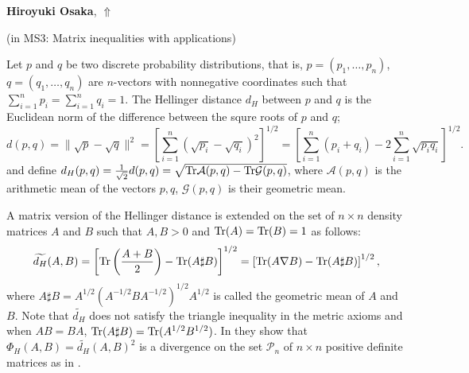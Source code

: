 \documentclass[ILAS2025-program.tex]{subfiles}
\begin{document}
\hypertarget{down0266}{}\begin{ilasabstract}
    
\textbf{Hiroyuki Osaka},  \hfill \hyperlink{up0266}{$\Uparrow$}
    
    
(in {\color{mstitle}MS3: Matrix inequalities with applications})
        
\mtskip
    \begin{bibunit}
        Let $p$ and $q$ be two discrete probability distributions, that is, $p=(p_1, \dots, p_n)$, $q = (q_1, \dots, q_n)$ are $n$-vectors with nonnegative coordinates such that $\sum_{i=1}^np_i = \sum_{i=1}^nq_i = 1$. The Hellinger distance $d_H$ between $p$ and $q$ is the Euclidean norm of the difference between the squre roots of $p$ and $q$; 
$$
d(p,q) = \|\sqrt{p}-\sqrt{q}\|^2 = \left[\sum_{i=1}^n(\sqrt{p_i}-\sqrt{q_i})^2\right]^{1/2}
 = \left[\sum_{i=1}^n(p_i+q_i) -2\sum_{i=1}^n\sqrt{p_iq_i}\right]^{1/2}.
$$
and define $d_H(p, q) = \frac{1}{\sqrt{2}}d(p,q) = \sqrt{{\rm Tr} \mathcal{A}(p,q) - {\rm Tr}\mathcal{G}(p,q)}$, where 
$\mathcal{A}(p,q)$ is the arithmetic mean of the vectors $p,q$, $\mathcal{G}(p,q)$ is their geometric mean.  

A matrix version of the Hellinger distance is extended on the set %
of $n \times n$   density matrices $A$ and $B$ such that $A, B > 0$ and ${\rm Tr}(A) = {\rm Tr}(B) = 1$ as follows:
$$
\widetilde{d_H}(A, B) = \left[{\rm Tr}\left(\frac{A + B}{2}\right) - {\rm Tr}(A\sharp B)\right]^{1/2} 
= \left[{\rm Tr}(A\nabla B) - {\rm Tr}(A\sharp B)\right]^{1/2} ,
$$
where $A \sharp B = A^{1/2}(A^{-1/2}BA^{-1/2})^{1/2}A^{1/2}$ is called the geometric mean of $A$ and $B$.
Note that $\widetilde{d_H}$ does not satisfy the triangle inequality in the metric axioms and when $AB = BA$, ${\rm Tr}(A \sharp B) = {\rm Tr}(A^{1/2}B^{1/2})$.  In \cite{BGJ  2019} 
they show that $\Phi_H(A, B) = \widetilde{d_H}(A,B)^2$ is a divergence on the set $\mathcal{P}_n$ of $n \times n$ positive definite matrices %
as in \cite[Sects 1.2 and 1.3]{SA 2016}.


\end{bibunit}
\end{ilasabstract}
\end{document}
